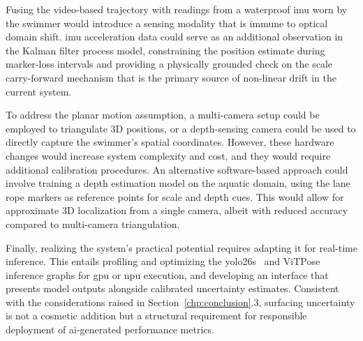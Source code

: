Fusing the video-based trajectory with readings from a waterproof \gls{imu}
worn by the swimmer would introduce a sensing modality that is immune to optical domain shift.
\gls{imu} acceleration data could serve as an additional observation in the Kalman filter process
model, constraining the position estimate during marker-loss intervals and providing a
physically grounded check on the scale carry-forward mechanism that is the primary source of
non-linear drift in the current system.

To address the planar motion assumption, a multi-camera setup could be employed to triangulate 3D positions, or a depth-sensing camera could be used to directly capture the swimmer's spatial coordinates. However, these hardware changes would increase system complexity and cost, and they would require additional calibration procedures. An alternative software-based approach could involve training a depth estimation model on the aquatic domain, using the lane rope markers as reference points for scale and depth cues. This would allow for approximate 3D localization from a single camera, albeit with reduced accuracy compared to multi-camera triangulation.

Finally, realizing the system's practical potential requires adapting it for real-time
inference. This entails profiling and optimizing the \gls{yolo26}s~\cite{jocher_ultralytics_2023}
and ViTPose inference graphs for \gls{gpu} or \gls{npu} execution, and developing an interface that
presents model outputs alongside calibrated uncertainty estimates. Consistent with the
considerations raised in Section~\ref{chp:conclusion}.3, surfacing uncertainty is not a
cosmetic addition but a structural requirement for responsible deployment of \gls{ai}-generated
performance metrics.